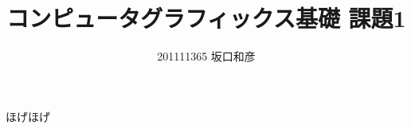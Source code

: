 \documentclass[titlepage]{jsarticle}
\title{コンピュータグラフィックス基礎 課題1}
\author{201111365 坂口和彦}
\begin{document}
\maketitle

ほげほげ
\end{document}
